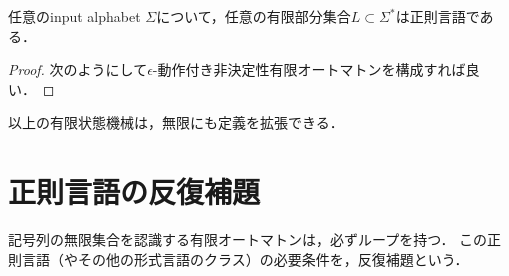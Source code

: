 \documentclass[uplatex, dvipdfmx]{jsreport}
\begin{document}
\begin{proposition}
    任意のinput alphabet $\Sigma$について，任意の有限部分集合$L\subset\Sigma^*$は正則言語である．
\end{proposition}
\begin{proof}
    次のようにして$\epsilon$-動作付き非決定性有限オートマトンを構成すれば良い．

\end{proof}

以上の有限状態機械は，無限にも定義を拡張できる．

\section{正則言語の反復補題}

\begin{screen}
    記号列の無限集合を認識する有限オートマトンは，必ずループを持つ．
    この正則言語（やその他の形式言語のクラス）の必要条件を，反復補題という．
\end{screen}
\end{document}

